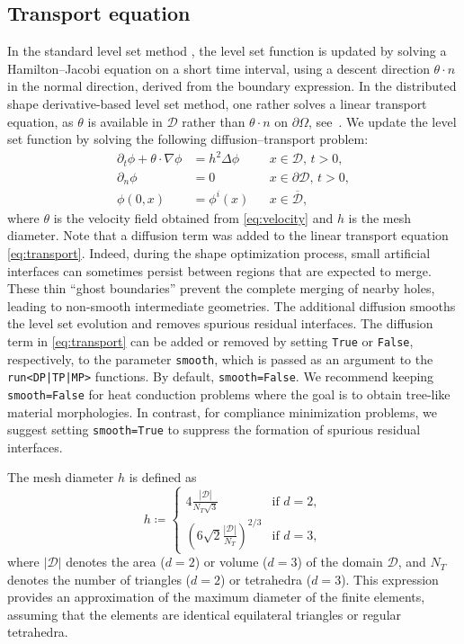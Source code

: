 \documentclass[preprint,9pt]{elsarticle}
\begin{document}
\subsection{Transport equation}\label{sub:level}

In the standard level set method \cite{MR965860},
the level set function is updated by solving
a Hamilton--Jacobi equation on a short time interval,
using a descent direction $\theta\cdot n$
in the normal direction,  derived from the boundary expression.
In the distributed shape derivative-based level set method,
one rather solves a linear transport equation, as $\theta$ is available
in $\mathcal{D}$ rather than $\theta\cdot n$ on $\partial\Omega$,
see~\cite{MR3535238}.  
We update the level set function by solving the following diffusion--transport problem:
\begin{equation}\label{eq:transport}
\begin{aligned}
	\partial_t \phi+\theta\cdot\nabla\phi
		&= h^2\Delta\phi && x\in \mathcal{D},\, t>0, \\
	\partial_{n} \phi
		&= 0 && x\in \partial\mathcal{D},\, t>0, \\
	\phi(0, x)
		&= \phi^{i}(x) && x\in \overline{\mathcal{D}},
\end{aligned}
\end{equation}
where $\theta$ is the velocity field obtained from \eqref{eq:velocity}
and $h$ is the mesh diameter.
Note that a diffusion term was added to
the linear transport equation \eqref{eq:transport}.
Indeed, during the shape optimization process, small artificial interfaces
can sometimes persist between regions that are expected to merge.
These thin ``ghost boundaries'' prevent the complete merging of nearby holes,
leading to non-smooth intermediate geometries.
The additional diffusion smooths the level set evolution
and removes spurious residual interfaces.
The diffusion term in \eqref{eq:transport} can be added or removed
by setting \texttt{True} or \texttt{False}, respectively,
to the parameter \texttt{smooth},
which is passed as an argument to the \texttt{run<DP|TP|MP>} functions.
By default, \texttt{smooth=False}.
We recommend keeping \texttt{smooth=False} for heat conduction problems
where the goal is to obtain tree-like material morphologies.
In contrast, for compliance minimization problems,
we suggest setting \texttt{smooth=True} to suppress
the formation of spurious residual interfaces.

The mesh diameter $h$ is defined as
\[
	h\coloneqq
	\begin{cases}
		4\frac{\left|\mathcal{D}\right|}{N_T\sqrt{3}}
			& \text{if } d = 2,\\
		\left(6\sqrt{2}\frac{\left|\mathcal{D}\right|}{N_T}\right)^{2/3}
			& \text{if } d = 3,
	\end{cases}
\]
where $\left|\mathcal{D}\right|$ denotes the area ($d=2$) or volume ($d=3$)
of the domain $\mathcal{D}$, and $N_T$ denotes the number of triangles ($d=2$) 
or tetrahedra ($d=3$).
This expression provides an approximation of
the maximum diameter of the finite elements,
assuming that the elements are identical equilateral triangles
or regular tetrahedra.
\end{document}
